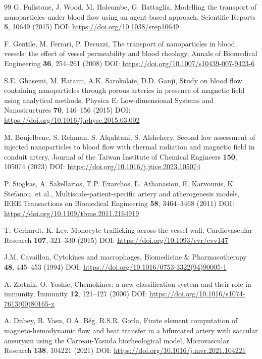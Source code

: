 \documentclass[10pt]{NSP1}
\begin{document}
\begin{thebibliography}{99}
		G. Fullstone, J. Wood, M. Holcombe, G. Battaglia, Modelling the transport of nanoparticles under blood flow using an agent-based approach, Scientific Reports \textbf{5}, 10649 (2015) DOI: \url{https://doi.org/10.1038/srep10649}
		
		F. Gentile, M. Ferrari, P. Decuzzi, The transport of nanoparticles in blood vessels: the effect of vessel permeability and blood rheology, Annals of Biomedical Engineering \textbf{36}, 254--261 (2008) DOI: \url{https://doi.org/10.1007/s10439-007-9423-6}
		
		S.E. Ghasemi, M. Hatami, A.K. Sarokolaie, D.D. Ganji, Study on blood flow containing nanoparticles through porous arteries in presence of magnetic field using analytical methods, Physica E: Low-dimensional Systems and Nanostructures \textbf{70}, 146--156 (2015) DOI: \url{https://doi.org/10.1016/j.physe.2015.03.002}
		
		M. Boujelbene, S. Rehman, S. Alqahtani, S. Alshehery, Second law assessment of injected nanoparticles to blood flow with thermal radiation and magnetic field in conduit artery, Journal of the Taiwan Institute of Chemical Engineers \textbf{150}, 105074 (2023) DOI: \url{https://doi.org/10.1016/j.jtice.2023.105074}
		
		P. Siogkas, A. Sakellarios, T.P. Exarchos, L. Athanasiou, E. Karvounis, K. Stefanou, et al., Multiscale-patient-specific artery and atherogenesis models, IEEE Transactions on Biomedical Engineering \textbf{58}, 3464--3468 (2011) DOI: \url{https://doi.org/10.1109/tbme.2011.2164919}
		
		T. Gerhardt, K. Ley, Monocyte trafficking across the vessel wall, Cardiovascular Research \textbf{107}, 321--330 (2015) DOI: \url{https://doi.org/10.1093/cvr/cvv147}
		
		J.M. Cavaillon, Cytokines and macrophages, Biomedicine \& Pharmacotherapy \textbf{48}, 445--453 (1994) DOI: \url{https://doi.org/10.1016/0753-3322(94)90005-1}
		
		A. Zlotnik, O. Yoshie, Chemokines: a new classification system and their role in immunity, Immunity \textbf{12}, 121--127 (2000) DOI: \url{https://doi.org/10.1016/s1074-7613(00)80165-x}
		
		A. Dubey, B. Vasu, O.A. Bég, R.S.R. Gorla, Finite element computation of magneto-hemodynamic flow and heat transfer in a bifurcated artery with saccular aneurysm using the Carreau-Yasuda biorheological model, Microvascular Research \textbf{138}, 104221 (2021) DOI: \url{https://doi.org/10.1016/j.mvr.2021.104221}
		

\end{thebibliography}
\end{document}
